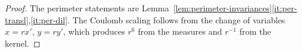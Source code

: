 \begin{proof}
The perimeter statements are
Lemma~\ref{lem:perimeter-invariances}\ref{it:per-transl},\ref{it:per-dil}.
The Coulomb scaling follows from the change of variables $x=rx'$, $y=ry'$,
which produces $r^6$ from the measures and $r^{-1}$ from the kernel.
\end{proof}

